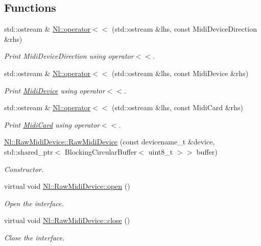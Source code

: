 \subsection*{Functions}
\begin{DoxyCompactItemize}
\item 
std\+::ostream \& \hyperlink{group__Midi_gaefa21e4261d1168eec79e36db5859c67}{Nl\+::operator$<$$<$} (std\+::ostream \&lhs, const Midi\+Device\+Direction \&rhs)
\begin{DoxyCompactList}\small\item\em Print Midi\+Device\+Direction using operator$<$$<$. \end{DoxyCompactList}\item 
std\+::ostream \& \hyperlink{group__Midi_ga39552abb8475b7a722d4710b056d9e2e}{Nl\+::operator$<$$<$} (std\+::ostream \&lhs, const Midi\+Device \&rhs)
\begin{DoxyCompactList}\small\item\em Print \hyperlink{structNl_1_1MidiDevice}{Midi\+Device} using operator$<$$<$. \end{DoxyCompactList}\item 
std\+::ostream \& \hyperlink{group__Midi_ga8876ffd695a43dee285ebda5dc6c2a25}{Nl\+::operator$<$$<$} (std\+::ostream \&lhs, const Midi\+Card \&rhs)
\begin{DoxyCompactList}\small\item\em Print \hyperlink{structNl_1_1MidiCard}{Midi\+Card} using operator$<$$<$. \end{DoxyCompactList}\item 
\hyperlink{group__Midi_ga5ad811af40ee0c2b2c97f63bd9d6163b}{Nl\+::\+Raw\+Midi\+Device\+::\+Raw\+Midi\+Device} (const devicename\+\_\+t \&device, std\+::shared\+\_\+ptr$<$ Blocking\+Circular\+Buffer$<$ uint8\+\_\+t $>$$>$ buffer)
\begin{DoxyCompactList}\small\item\em Constructor. \end{DoxyCompactList}\item 
virtual void \hyperlink{group__Midi_gace91f1137effd037eca8b3b959508f91}{Nl\+::\+Raw\+Midi\+Device\+::open} ()
\begin{DoxyCompactList}\small\item\em Open the interface. \end{DoxyCompactList}\item 
virtual void \hyperlink{group__Midi_gaa66489de15df30f282637b8a1bcd263d}{Nl\+::\+Raw\+Midi\+Device\+::close} ()
\begin{DoxyCompactList}\small\item\em Close the interface. \end{DoxyCompactList}\item 
$$
\end{DoxyCompactItemize}
